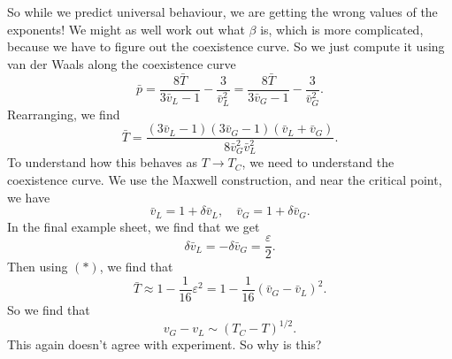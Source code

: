 \documentclass[a4paper]{article}
\begin{document}
So while we predict universal behaviour, we are getting the wrong values of the exponents! We might as well work out what $\beta$ is, which is more complicated, because we have to figure out the coexistence curve. So we just compute it using van der Waals along the coexistence curve
\[
  \bar{p} = \frac{8 \bar{T}}{ 3 \bar{v}_L - 1} - \frac{3}{\bar{v}_L^2} = \frac{8 \bar{T}}{ 3 \bar{v}_G - 1} - \frac{3}{\bar{v}_G^2}.
\]
Rearranging, we find
\[
  \bar{T} = \frac{(3 \bar{v}_L - 1)( 3 \bar{v}_G - 1) (\bar{v}_L + \bar{v}_G)}{8 \bar{v}_G^2 \bar{v}_L^2}.\tag{$*$}
\]
To understand how this behaves as $T \to T_C$, we need to understand the coexistence curve. We use the Maxwell construction, and near the critical point, we have
\[
  \bar{v}_L = 1 + \delta \bar{v}_L,\quad \bar{v}_G = 1 + \delta \bar{v}_G.
\]
In the final example sheet, we find that we get
\[
  \delta \bar{v}_L = - \delta \bar{v}_G = \frac{\varepsilon}{2}.
\]
Then using $(*)$, we find that
\[
  \bar{T} \approx 1 - \frac{1}{16}\varepsilon^2 = 1 - \frac{1}{16} (\bar{v}_G - \bar{v}_L)^2.
\]
So we find that
\[
  v_G - v_L \sim (T_C - T)^{1/2}.
\]
This again doesn't agree with experiment. So why is this?
\end{document}
